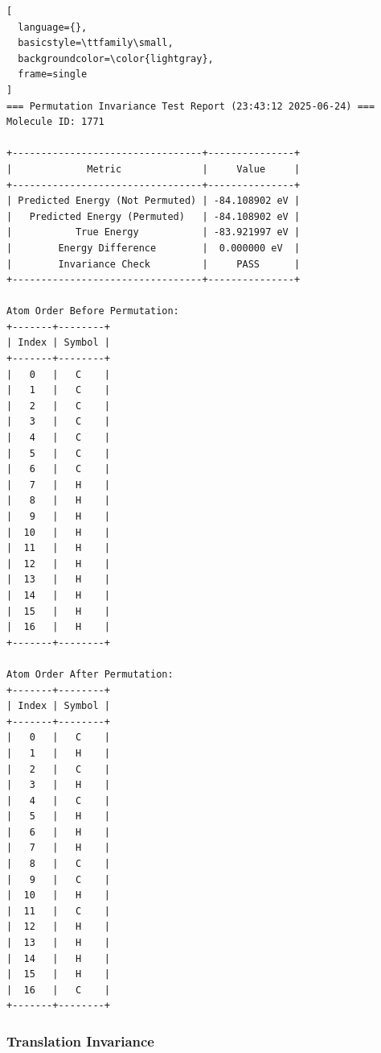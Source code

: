 \documentclass{article}
\begin{document}
\begin{lstlisting}[
  language={},
  basicstyle=\ttfamily\small,
  backgroundcolor=\color{lightgray},
  frame=single
]
=== Permutation Invariance Test Report (23:43:12 2025-06-24) ===
Molecule ID: 1771

+---------------------------------+---------------+
|             Metric              |     Value     |
+---------------------------------+---------------+
| Predicted Energy (Not Permuted) | -84.108902 eV |
|   Predicted Energy (Permuted)   | -84.108902 eV |
|           True Energy           | -83.921997 eV |
|        Energy Difference        |  0.000000 eV  |
|        Invariance Check         |     PASS      |
+---------------------------------+---------------+

Atom Order Before Permutation:
+-------+--------+
| Index | Symbol |
+-------+--------+
|   0   |   C    |
|   1   |   C    |
|   2   |   C    |
|   3   |   C    |
|   4   |   C    |
|   5   |   C    |
|   6   |   C    |
|   7   |   H    |
|   8   |   H    |
|   9   |   H    |
|  10   |   H    |
|  11   |   H    |
|  12   |   H    |
|  13   |   H    |
|  14   |   H    |
|  15   |   H    |
|  16   |   H    |
+-------+--------+

Atom Order After Permutation:
+-------+--------+
| Index | Symbol |
+-------+--------+
|   0   |   C    |
|   1   |   H    |
|   2   |   C    |
|   3   |   H    |
|   4   |   C    |
|   5   |   H    |
|   6   |   H    |
|   7   |   H    |
|   8   |   C    |
|   9   |   C    |
|  10   |   H    |
|  11   |   C    |
|  12   |   H    |
|  13   |   H    |
|  14   |   H    |
|  15   |   H    |
|  16   |   C    |
+-------+--------+
\end{lstlisting}


\subsubsection{Translation Invariance}
\end{document}
